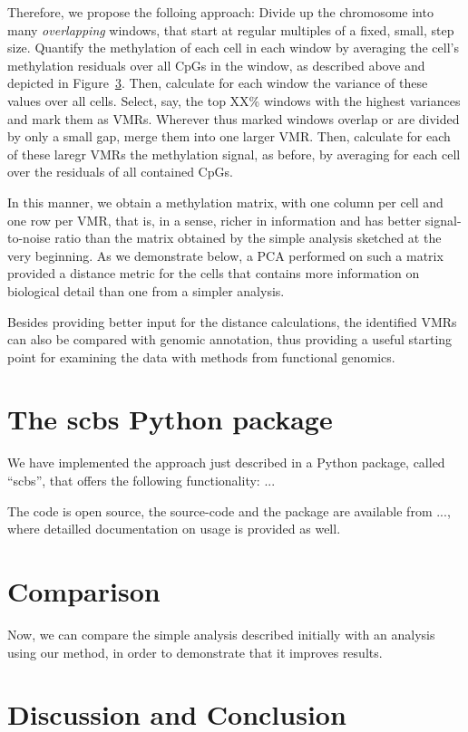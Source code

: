\documentclass[twocolumn,10pt]{article}
\begin{document}
Therefore, we propose the folloing approach: Divide up the chromosome into many \emph{overlapping} windows, that start at regular multiples of a fixed, small, step size. Quantify the methylation of each cell in each window by averaging the cell's methylation residuals over all CpGs in the window, as described above and depicted in Figure\ \ref{}. Then, calculate for each window the variance of these values over all cells. Select, say, the top XX\% windows with the highest variances and mark them as VMRs. Wherever thus marked windows overlap or are divided by only a small gap, merge them into one larger VMR. Then, calculate for each of these laregr VMRs the methylation signal, as before, by averaging for each cell over the residuals of all contained CpGs.

In this manner, we obtain a methylation matrix, with one column per cell and one row per VMR, that is, in a sense, richer in information and has better signal-to-noise ratio than the matrix obtained by the simple analysis sketched at the very beginning. As we demonstrate below, a PCA performed on such a matrix provided a distance metric for the cells that contains more information on biological detail than one from a simpler analysis. 

Besides providing better input for the distance calculations, the identified VMRs can also be compared with genomic annotation, thus providing a useful starting point for examining the data with methods from functional genomics.

\section{The scbs Python package}

We have implemented the approach just described in a Python package, called ``scbs'', that offers the following functionality: ...

The code is open source, the source-code and the package are available from ..., where detailled documentation on usage is provided as well.

\section{Comparison}

Now, we can compare the simple analysis described initially with an analysis using our method, in order to demonstrate that it improves results.

\section{Discussion and Conclusion}
\end{document}
